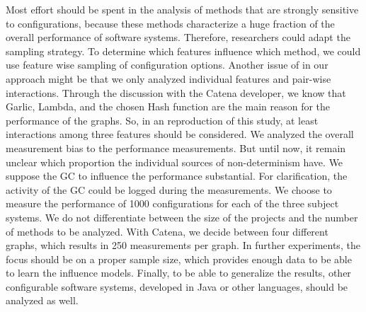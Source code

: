 Most effort should be spent in the analysis of methods that are strongly sensitive to configurations, because these methods characterize a huge fraction of the overall performance of software systems. 
Therefore, researchers could adapt the sampling strategy. To determine which features influence which method, we could use feature wise sampling of configuration options. 
Another issue of in our approach might be that we only analyzed individual features and pair-wise interactions. Through the discussion with the Catena developer, we know that Garlic, Lambda, and the chosen Hash function are the main reason for the performance of the graphs. So, in an reproduction of this study, at least interactions among three features should be considered.
We analyzed the overall measurement bias to the performance measurements. But until now, it remain unclear which proportion the individual sources of non-determinism have. We suppose the \ac{GC} to influence the performance substantial. For clarification, the activity of the \ac{GC} could be logged during the measurements.
We choose to measure the performance of 1000 configurations for each of the three subject systems. We do not differentiate between the size of the projects and the number of methods to be analyzed. With Catena, we decide between four different graphs, which results in 250 measurements per graph. In further experiments, the focus should be on a proper sample size, which provides enough data to be able to learn the influence models.
Finally, to be able to generalize the results, other configurable software systems, developed in Java or other languages, should be analyzed as well. 
